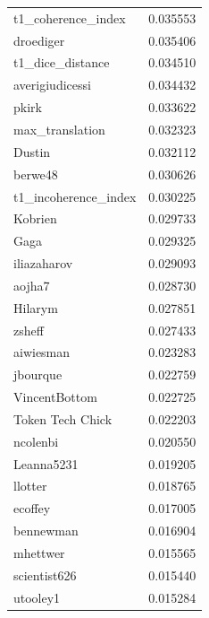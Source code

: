 \documentclass[9pt,lineno]{elife}
\begin{document}
\begin{appendixbox}
\begin{longtable}{lr}
t1\_coherence\_index         &                  0.035553 \\
droediger                  &                  0.035406 \\
t1\_dice\_distance           &                  0.034510 \\
averigiudicessi            &                  0.034432 \\
pkirk                      &                  0.033622 \\
max\_translation            &                  0.032323 \\
Dustin                     &                  0.032112 \\
berwe48                    &                  0.030626 \\
t1\_incoherence\_index       &                  0.030225 \\
Kobrien                    &                  0.029733 \\
Gaga                       &                  0.029325 \\
iliazaharov                &                  0.029093 \\
aojha7                     &                  0.028730 \\
Hilarym                    &                  0.027851 \\
zsheff                     &                  0.027433 \\
aiwiesman                  &                  0.023283 \\
jbourque                   &                  0.022759 \\
VincentBottom              &                  0.022725 \\
Token Tech Chick           &                  0.022203 \\
ncolenbi                   &                  0.020550 \\
Leanna5231                 &                  0.019205 \\
llotter                    &                  0.018765 \\
ecoffey                    &                  0.017005 \\
bennewman                  &                  0.016904 \\
mhettwer                   &                  0.015565 \\
scientist626               &                  0.015440 \\
utooley1                   &                  0.015284 \\

\end{longtable}
\end{appendixbox}
\end{document}
